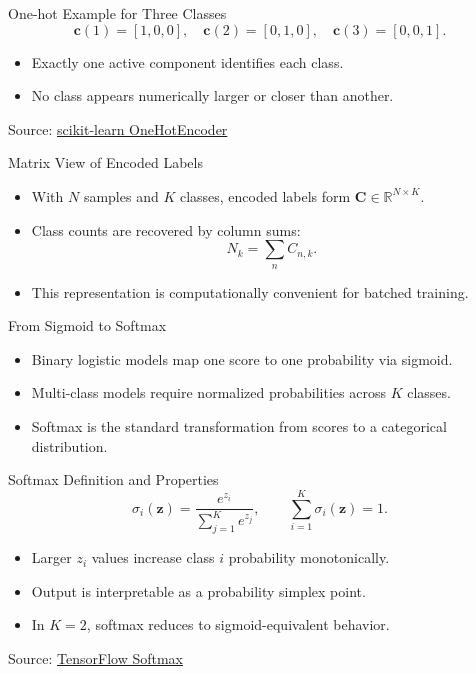 \documentclass[10pt]{beamer}
\begin{document}
\begin{frame}{One-hot Example for Three Classes}
  \justifying
  \[
    \mathbf{c}(1)=[1,0,0],\quad
    \mathbf{c}(2)=[0,1,0],\quad
    \mathbf{c}(3)=[0,0,1].
  \]
  \begin{itemize}
    \item Exactly one active component identifies each class.
    \item No class appears numerically larger or closer than another.
  \end{itemize}
  \vspace{0.3em}
  {\footnotesize Source: \href{https://scikit-learn.org/stable/modules/generated/sklearn.preprocessing.OneHotEncoder.html}{scikit-learn OneHotEncoder}}
\end{frame}

\begin{frame}{Matrix View of Encoded Labels}
  \justifying
  \begin{itemize}
    \item With $N$ samples and $K$ classes, encoded labels form $\mathbf{C}\in\mathbb{R}^{N\times K}$.
    \item Class counts are recovered by column sums:
    \[
      N_k = \sum_n C_{n,k}.
    \]
    \item This representation is computationally convenient for batched training.
  \end{itemize}
\end{frame}

\begin{frame}{From Sigmoid to Softmax}
  \justifying
  \begin{itemize}
    \item Binary logistic models map one score to one probability via sigmoid.
    \item Multi-class models require normalized probabilities across $K$ classes.
    \item Softmax is the standard transformation from scores to a categorical distribution.
  \end{itemize}
\end{frame}

\begin{frame}{Softmax Definition and Properties}
  \justifying
  \[
    \sigma_i(\bm{z})=\frac{e^{z_i}}{\sum_{j=1}^K e^{z_j}},
    \qquad
    \sum_{i=1}^K \sigma_i(\bm{z})=1.
  \]
  \begin{itemize}
    \item Larger $z_i$ values increase class $i$ probability monotonically.
    \item Output is interpretable as a probability simplex point.
    \item In $K=2$, softmax reduces to sigmoid-equivalent behavior.
  \end{itemize}
  \vspace{0.3em}
  {\footnotesize Source: \href{https://www.tensorflow.org/api_docs/python/tf/keras/layers/Softmax}{TensorFlow Softmax}}
\end{frame}
\end{document}
